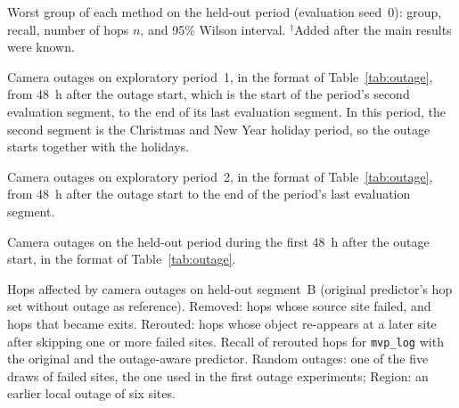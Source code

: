 \begin{table}[t]
\centering
\caption{Worst group of each method on the held-out period (evaluation seed~0):
group, recall, number of hops $n$, and 95\% Wilson interval.
$^\dagger$Added after the main results were known.}
\label{tab:worst_groups}
\footnotesize

\end{table}

\begin{table}[t]
\centering
\caption{Camera outages on exploratory period~1, in the format of
Table~\ref{tab:outage}, from 48~h after the outage start, which is the start of
the period's second evaluation segment, to the end of its last evaluation
segment. In this period, the second segment is the Christmas and New Year holiday
period, so the outage starts together with the holidays.}
\label{tab:outage_expl1}
\footnotesize

\end{table}

\begin{table}[t]
\centering
\caption{Camera outages on exploratory period~2, in the format of
Table~\ref{tab:outage}, from 48~h after the outage start to the end of the
period's last evaluation segment.}
\label{tab:outage_expl2}
\footnotesize

\end{table}

\begin{table}[t]
\centering
\caption{Camera outages on the held-out period during the first 48~h after the
outage start, in the format of Table~\ref{tab:outage}.}
\label{tab:outage_early}
\footnotesize

\end{table}

\begin{table}[t]
\centering
\caption{Hops affected by camera outages on held-out segment~B (original
predictor's hop set without outage as reference). Removed: hops whose source site
failed, and hops that became exits. Rerouted: hops whose object re-appears at a
later site after skipping one or more failed sites. Recall of rerouted hops for
\texttt{mvp\_log} with the original and the outage-aware predictor. Random
outages: one of the five draws of failed sites, the one used in the first outage
experiments; Region: an earlier local outage of six sites.}
\label{tab:lost_hops}
\footnotesize

\end{table}

